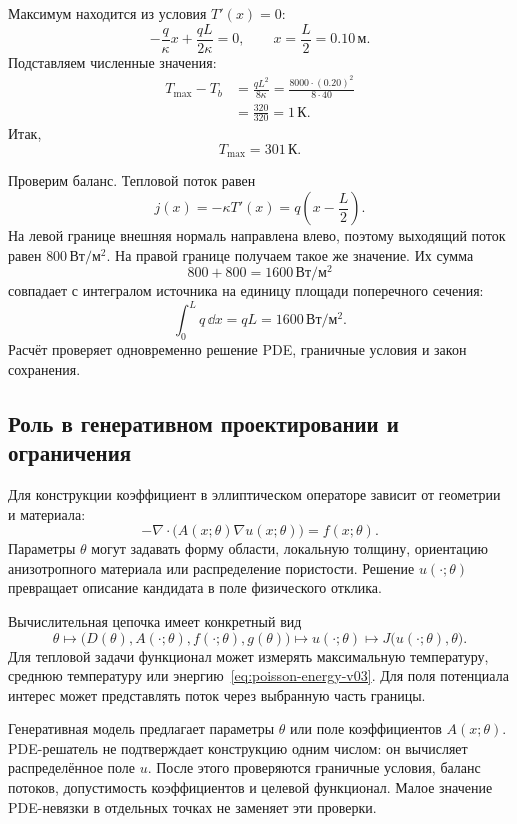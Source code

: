Максимум находится из условия $T'(x)=0$:
\[
-\frac{q}{\kappa}x+\frac{qL}{2\kappa}=0,
\qquad
x=\frac{L}{2}=0.10\,\text{м}.
\]
Подставляем численные значения:
\begin{align}
T_{\max}-T_b
&=
\frac{qL^2}{8\kappa}
=
\frac{8000\cdot(0.20)^2}{8\cdot40}
\\
&=
\frac{320}{320}
=1\,\text{К}.
\end{align}
Итак,
\begin{equation}
\label{eq:rod-temperature-maximum-v03}
T_{\max}=301\,\text{К}.
\end{equation}

Проверим баланс. Тепловой поток равен
\[
j(x)=-\kappa T'(x)
=q\left(x-\frac{L}{2}\right).
\]
На левой границе внешняя нормаль направлена влево, поэтому выходящий поток равен $800\,\text{Вт}/\text{м}^{2}$. На правой границе получаем такое же значение. Их сумма
\[
800+800=1600\,\text{Вт}/\text{м}^{2}
\]
совпадает с интегралом источника на единицу площади поперечного сечения:
\[
\int_0^L q\,\dd x=qL=1600\,\text{Вт}/\text{м}^{2}.
\]
Расчёт проверяет одновременно решение PDE, граничные условия и закон сохранения.

\subsection{Роль в генеративном проектировании и ограничения}

Для конструкции коэффициент в эллиптическом операторе зависит от геометрии и материала:
\begin{equation}
\label{eq:design-poisson-v03}
-\nabla\cdot
\bigl(A(x;\theta)\nabla u(x;\theta)\bigr)
=f(x;\theta).
\end{equation}
Параметры $\theta$ могут задавать форму области, локальную толщину, ориентацию анизотропного материала или распределение пористости. Решение $u(\cdot;\theta)$ превращает описание кандидата в поле физического отклика.

Вычислительная цепочка имеет конкретный вид
\[
\theta
\longmapsto
\bigl(D(\theta),A(\cdot;\theta),f(\cdot;\theta),g(\theta)\bigr)
\longmapsto
u(\cdot;\theta)
\longmapsto
J\bigl(u(\cdot;\theta),\theta\bigr).
\]
Для тепловой задачи функционал может измерять максимальную температуру, среднюю температуру или энергию~\eqref{eq:poisson-energy-v03}. Для поля потенциала интерес может представлять поток через выбранную часть границы.

\begin{mlconnection}
Генеративная модель предлагает параметры $\theta$ или поле коэффициентов $A(x;\theta)$. PDE-решатель не подтверждает конструкцию одним числом: он вычисляет распределённое поле $u$. После этого проверяются граничные условия, баланс потоков, допустимость коэффициентов и целевой функционал. Малое значение PDE-невязки в отдельных точках не заменяет эти проверки.
\end{mlconnection}


